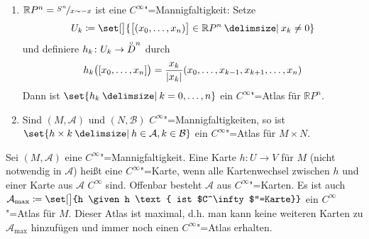 \begin{beispiel}[{name=[differenzierbare Mannigfaltigkeiten]},label=bsp:diff_mfkt]
\begin{enumerate}[(1)]
\begin{figure}[htbp]
{\begin{tikzpicture}[scale=1.5]
			\end{tikzpicture}
			\caption{Die $C^\infty$"=Mannigfaltigkeit $S^2$ mit dem Kartengebiet $U_{3,0}$}}
		\end{figure}
		\item \label{enum:RPn_mfkt} $\mathbb{R}P^n = \nicefrac{S^n}{x \sim -x}$ ist eine $C^\infty$"=Mannigfaltigkeit: Setze 
		\[
			U_k \coloneqq \set[\big]{{\benbrace[\big]{(x_0, \ldots, x_n)} \in \mathbb{R}P^n} \given x_k \neq 0} 
		\]
		und definiere $h_k \colon U_k \to \interior{D}^n$ durch
		\[
			h_k \enbrace[\big]{[x_0, \ldots, x_n]} = \frac{x_k}{\abs*{x_k}} \enbrace*{x_0, \ldots , x_{k-1}, x_{k+1}, \ldots, x_n} 
		\]
		Dann ist $\set{h_k \given k=0, \ldots, n}$ ein $C^\infty$"=Atlas für $\mathbb{R}P^n$.
		\item Sind $(M, \mathcal{A})$ und $(N, \mathcal{B})$ $C^\infty$"=Mannigfaltigkeiten, so ist $\set{h \times k \given h \in \mathcal{A}, k \in \mathcal{B}}$ ein $C^\infty$"=Atlas für $M \times N$.
	\end{enumerate}
\end{beispiel}

\begin{bemerkung}[{name=[maximaler Atlas]}]
	Sei $(M,\mathcal{A})$ eine $C^\infty$"=Mannigfaltigkeit. 
	Eine Karte $h \colon U \to V$ für $M$ (nicht notwendig in $\mathcal{A}$) heißt eine $C^\infty$"=Karte, wenn alle 
	Kartenwechsel zwischen $h$ und einer Karte aus $\mathcal{A}$ $C^\infty$ sind. 
	Offenbar besteht $\mathcal{A}$ aus $C^\infty$"=Karten. 
	Es ist auch $\mathcal{A}_\mathrm{max}\coloneqq \set[\big]{h \given h \text{ ist $C^\infty$"=Karte}}$ ein $C^\infty$"=Atlas für $M$. 
	Dieser Atlas ist maximal, d.h. man kann keine weiteren Karten zu $\mathcal{A}_\mathrm{max}$ hinzufügen und immer noch einen $C^\infty$"=Atlas erhalten.
\end{bemerkung}

